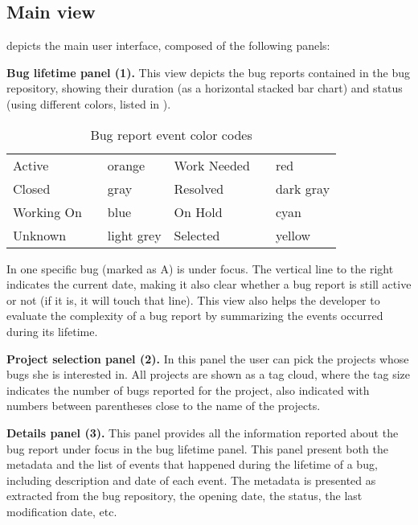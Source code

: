 \subsection{Main view}\label{main-view}

 depicts the main user interface, composed of the following panels:

{\bf Bug lifetime panel (1).} \label{bug-lifetime-panel} This view depicts the bug reports contained in the bug repository, showing their duration (as a horizontal stacked bar chart) and status (using different colors, listed in ).

\begin{table}[ht]
\center
\caption{Bug report event color codes}
\label{tab-colors}
\begin{tabular}{p{1.4cm} p{0.1cm} p{1.3cm} | p{1.4cm} p{0.1cm} p{1.2cm} } \hline
Active & \cellcolor{active} & orange & Work Needed & \cellcolor{work needed} & red \\
Closed & \cellcolor{closed} & gray & Resolved & \cellcolor{resolved} & dark gray \\
Working On & \cellcolor{working on} & blue & On Hold & \cellcolor{on hold} & cyan \\
Unknown & \cellcolor{unknown} & light grey & Selected & \cellcolor{yellow} & yellow \\ \hline
\end{tabular}
\end{table}

In  one specific bug (marked as A) is under focus. The vertical line to the right indicates the current date, making it also clear whether a bug report is still active or not (if it is, it will touch that line). This view also helps the developer to evaluate the complexity of a bug report by summarizing the events occurred during its lifetime.

{\bf Project selection panel (2).} In this panel the user can pick the projects whose bugs she is interested in. All projects are shown as a tag cloud, where the tag size indicates the number of bugs reported for the project, also indicated with numbers between parentheses close to the name of the projects.

{\bf Details panel (3).} This panel provides all the information reported about the bug report under focus in the bug lifetime panel. This panel present both the metadata and the list of events that happened during the lifetime of a bug, including description and date of each event. The metadata is presented as extracted from the bug repository, \eg the opening date, the status, the last modification date, etc.

